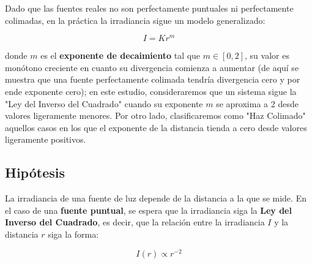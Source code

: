 Dado que las fuentes reales no son perfectamente puntuales ni perfectamente colimadas, en la práctica la irradiancia sigue un modelo generalizado:

\begin{mdframed}
\begin{equation}
I = K r^m
\end{equation}
\end{mdframed}

donde $m$ es el \textbf{exponente de decaimiento} tal que $m \in [0,2]$, su valor es monótono creciente en cuanto su divergencia comienza a aumentar (de aquí se muestra que una fuente perfectamente colimada tendría divergencia cero y por ende exponente cero); en este estudio, consideraremos que un sistema sigue la "Ley del Inverso del Cuadrado" cuando su exponente \( m \) se aproxima a 2 desde valores ligeramente menores. Por otro lado, clasificaremos como "Haz Colimado" aquellos casos en los que el exponente de la distancia tienda a cero desde valores ligeramente positivos.

\subsection{Hipótesis}

La irradiancia de una fuente de luz depende de la distancia a la que se mide. En el caso de una \textbf{fuente puntual}, se espera que la irradiancia siga la \textbf{Ley del Inverso del Cuadrado}, es decir, que la relación entre la irradiancia \( I \) y la distancia \( r \) siga la forma:

\begin{mdframed}
\begin{equation}
    I(r) \propto r^{-2}
\end{equation}
\end{mdframed}


